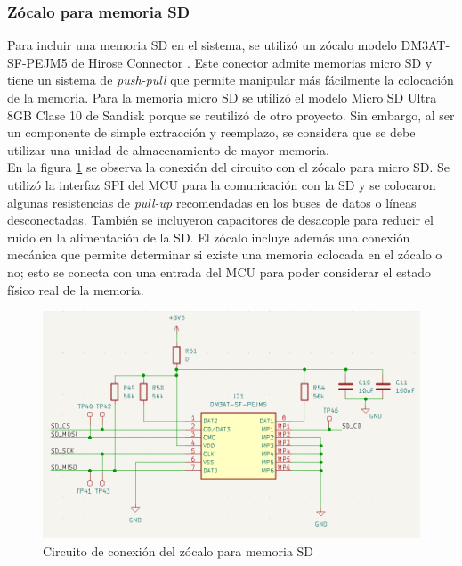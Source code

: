 \subsubsection{Zócalo para memoria SD}

Para incluir una memoria SD en el sistema, se utilizó un zócalo modelo DM3AT-SF-PEJM5 de Hirose Connector \cite{DM3AT-SF-PEJM5}. Este conector admite memorias micro SD y tiene un sistema de \textit{push-pull} que permite manipular más fácilmente la colocación de la memoria. Para la memoria micro SD se utilizó el modelo Micro SD Ultra 8GB Clase 10 de Sandisk \cite{sd_sandisk} porque se reutilizó de otro proyecto. Sin embargo, al ser un componente de simple extracción y reemplazo, se considera que se debe utilizar una unidad de almacenamiento de mayor memoria. \\

En la figura \ref{fig:sd_sch} se observa la conexión del circuito con el zócalo para micro SD. Se utilizó la interfaz SPI del MCU para la comunicación con la SD y se colocaron algunas resistencias de \textit{pull-up} recomendadas en los buses de datos o líneas desconectadas. También se incluyeron capacitores de desacople para reducir el ruido en la alimentación de la SD. El zócalo incluye además una conexión mecánica que permite determinar si existe una memoria colocada en el zócalo o no; esto se conecta con una entrada del MCU para poder considerar el estado físico real de la memoria. 



\begin{figure}[H]
    \centering
    \includegraphics[width = \linewidth]{img/sd_sch.png}
    \caption{Circuito de conexión del zócalo para memoria SD}
    \label{fig:sd_sch}
\end{figure}    